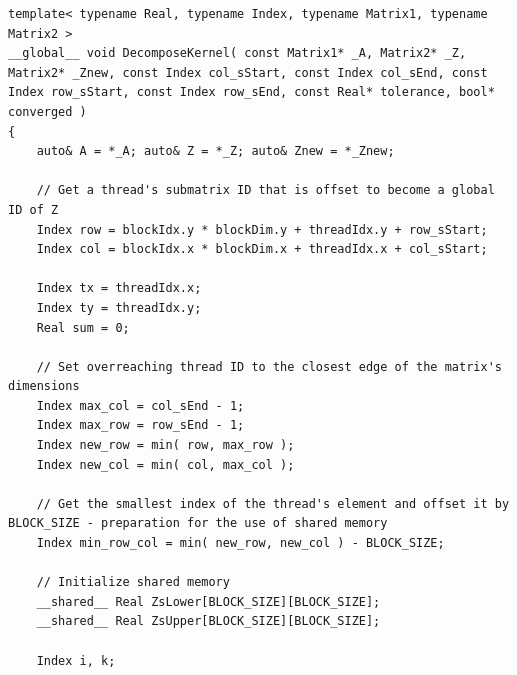 \begin{lstlisting}[caption={The constant \code{BLOCK\_SIZE} is by default hard-coded to be equal to 8 in the \code{CroutMethodIterative} header file using the \code{\#define} macro. The kernel takes matrices $ \mathbb{A} $, $ \mathbb{Z} $ (iteration $ t $ of $ \mathbb{Z} $), and $ \mathbb{Z}_{new} $ (iteration $ t+1 $ of $ \mathbb{Z} $) as input parameters, and uses other input variables to offset the threads in the grid so that only a specific section of $ \mathbb{Z} $ is computed. Note that the kernel is not part of the \code{CroutMethodIteartive} class since kernels cannot be members of a class - as mentioned in \textit{\nameref{Paragraph:CUDA-C++-extensions-outer-kernel-extensions-function-extensions}} in Section~\ref{Paragraph:CUDA-C++-extensions-outer-kernel-extensions-function-extensions} - however, it is located in the same file that it is called from. Taken from the Decomposition project repository on GitLab\protect\footref{Footnote:decomposition-project-gitlab-url}.},label={Listing:implementation-decomposition-project-lu-decomposition-iterative-crout-method-convergence-of-single-section},escapechar=@]
template< typename Real, typename Index, typename Matrix1, typename Matrix2 >
__global__ void DecomposeKernel( const Matrix1* _A, Matrix2* _Z, Matrix2* _Znew, const Index col_sStart, const Index col_sEnd, const Index row_sStart, const Index row_sEnd, const Real* tolerance, bool* converged )
{
	auto& A = *_A; auto& Z = *_Z; auto& Znew = *_Znew;
	
	// Get a thread's submatrix ID that is offset to become a global ID of Z
	Index row = blockIdx.y * blockDim.y + threadIdx.y + row_sStart;
	Index col = blockIdx.x * blockDim.x + threadIdx.x + col_sStart;
	
	Index tx = threadIdx.x;
	Index ty = threadIdx.y;
	Real sum = 0;
	
	// Set overreaching thread ID to the closest edge of the matrix's dimensions
	Index max_col = col_sEnd - 1;
	Index max_row = row_sEnd - 1;
	Index new_row = min( row, max_row );
	Index new_col = min( col, max_col );
	
	// Get the smallest index of the thread's element and offset it by BLOCK_SIZE - preparation for the use of shared memory
	Index min_row_col = min( new_row, new_col ) - BLOCK_SIZE;
	
	// Initialize shared memory
	__shared__ Real ZsLower[BLOCK_SIZE][BLOCK_SIZE];
	__shared__ Real ZsUpper[BLOCK_SIZE][BLOCK_SIZE];
	
	Index i, k;
	

\end{lstlisting}
